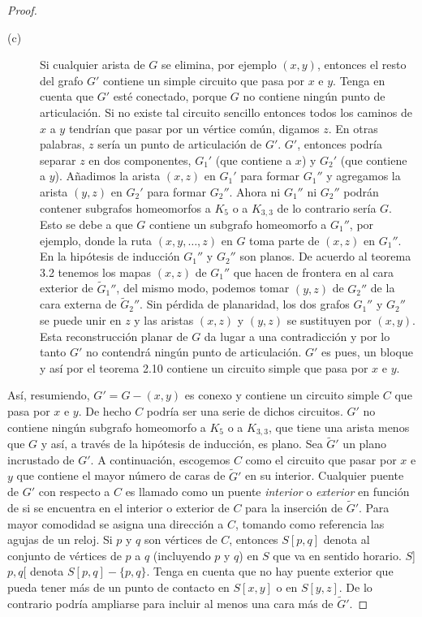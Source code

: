 \documentclass[10pt,a5paper]{book}
\begin{document}
\begin{proof}
\begin{description}
\item[(c)] Si cualquier arista de $G$ se elimina, por ejemplo $(x,y)$, entonces el resto del grafo $G'$ contiene un simple circuito que pasa por $x$ e $y$. Tenga en cuenta que $G'$ esté conectado, porque $G$ no contiene ningún punto de articulación. Si no existe tal circuito sencillo entonces todos los caminos de $x$ a $y$ tendrían que pasar por un vértice común, digamos $z$. En otras palabras, $z$ sería un punto de articulación de $G'$. $G'$, entonces podría separar $z$ en dos componentes, $G_1'$ (que contiene a $x$) y $G_2'$ (que contiene a $y$). Añadimos la arista $(x,z)$ en $G_1'$ para formar $G_1''$ y agregamos la arista $(y,z)$ en $G_2'$ para formar $G_2''$. Ahora ni $G_1''$ ni $G_2''$ podrán contener subgrafos homeomorfos a $K_5$ o a $K_{3,3}$ de lo contrario sería $G$. Esto se debe a que $G$ contiene un subgrafo homeomorfo a $G_1''$, por ejemplo, donde la ruta $(x, y, \ldots, z)$ en $G$ toma parte de $(x,z)$ en $G_1''$. En la hipótesis de inducción $G_1''$ y $G_2''$ son planos. De acuerdo al teorema 3.2 tenemos los mapas $(x,z)$ de $G_1''$ que hacen de frontera en al cara exterior de $\widetilde{G}_1''$, del mismo modo, podemos tomar $(y,z)$ de $G_2''$ de la cara externa de $\widetilde{G}_2''$. Sin pérdida de planaridad, los dos grafos $G_1''$ y $G_2''$ se puede unir en $z$ y las aristas $(x,z)$ y $(y,z)$ se sustituyen por $(x,y)$. Esta reconstrucción planar de $G$ da lugar a una contradicción y por lo tanto $G'$ no contendrá ningún punto de articulación. $G'$ es pues, un bloque y así por el teorema 2.10 contiene un circuito simple que pasa por $x$ e $y$.
\end{description}

Así, resumiendo, $G' = G - (x,y)$ es conexo y contiene un circuito simple $C$ que pasa por $x$ e $y$. De hecho $C$ podría ser una serie de dichos circuitos. $G'$ no contiene ningún subgrafo homeomorfo a $K_5$ o a $K_{3,3}$, que tiene una arista menos que $G$ y así, a través de la hipótesis de inducción, es plano. Sea $\widetilde{G}'$ un plano incrustado de $G'$. A continuación, escogemos $C$ como el circuito que pasar por $x$ e $y$ que contiene el mayor número de caras de $\widetilde{G}'$ en su interior. Cualquier puente de $G'$ con respecto a $C$ es llamado como un puente \emph{interior} o \emph{exterior} en función de si se encuentra en el interior o exterior de $C$ para la inserción de $\widetilde{G}'$. Para mayor comodidad se asigna una dirección a $C$, tomando como referencia las agujas de un reloj. Si $p$ y $q$ son vértices de $C$, entonces $S[p,q]$ denota al conjunto de vértices de $p$ a $q$ (incluyendo $p$ y $q$) en $S$ que va en sentido horario. $S$]$p,q$[ denota $S[p,q] -\{p,q\}$. Tenga en cuenta que no hay puente exterior que pueda tener más de un punto de contacto en $S[x,y]$ o en $S[y,z]$. De lo contrario podría ampliarse para incluir al menos una cara más de $\widetilde{G}'$.


\end{proof}
\end{document}

